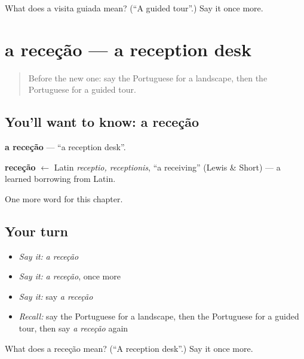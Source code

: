 \begin{tcolorbox}[breakable,colback=teal!4,colframe=teal!35!black,title={Before you move on}]
What does a visita guiada mean? (\textquotedblleft{}A guided tour\textquotedblright{}.) Say it once more.
\end{tcolorbox}
\section[a receção]{a receção — a reception desk}

\label{lesson:PT-C197-rececao}



\begin{quote}
Before the new one: say the Portuguese for a landscape, then the Portuguese for a guided tour.
\end{quote}

\subsection*{You'll want to know: a receção}
\textbf{a receção} — \textquotedblleft{}a reception desk\textquotedblright{}.

\begin{cousinweb}
\textbf{receção} $\leftarrow$ Latin \emph{receptio, receptionis}, \textquotedblleft{}a receiving\textquotedblright{} (Lewis \& Short) — a learned borrowing from Latin.
\end{cousinweb}

\begin{grammarlens}[title={What you've built}]
One more word for this chapter.
\end{grammarlens}

\subsection*{Your turn}
\begin{itemize}
\raggedright
  \item \emph{Say it:} \emph{a receção}
  \item \emph{Say it:} \emph{a receção}, once more
  \item \emph{Say it:} say \emph{a receção}
  \item \emph{Recall:} say the Portuguese for a landscape, then the Portuguese for a guided tour, then say \emph{a receção} again
\end{itemize}

\begin{tcolorbox}[breakable,colback=teal!4,colframe=teal!35!black,title={Before you move on}]
What does a receção mean? (\textquotedblleft{}A reception desk\textquotedblright{}.) Say it once more.
\end{tcolorbox}
